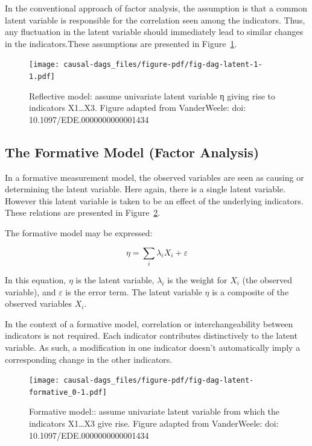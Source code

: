 \documentclass[
  singlecolumn]{report}
\begin{document}
In the conventional approach of factor analysis, the assumption is that
a common latent variable is responsible for the correlation seen among
the indicators. Thus, any fluctuation in the latent variable should
immediately lead to similar changes in the indicators.These assumptions
are presented in Figure~\ref{fig-dag-latent-1}.

\begin{figure}

{\centering \texttt{[image: causal-dags\_files/figure-pdf/fig-dag-latent-1-1.pdf]}

}

\caption{\label{fig-dag-latent-1}Reflective model: assume univariate
latent variable η giving rise to indicators X1\ldots X3. Figure adapted
from VanderWeele: doi: 10.1097/EDE.0000000000001434}

\end{figure}

\hypertarget{the-formative-model-factor-analysis}{%
\subsection{The Formative Model (Factor
Analysis)}\label{the-formative-model-factor-analysis}}

In a formative measurement model, the observed variables are seen as
causing or determining the latent variable. Here again, there is a
single latent variable. However this latent variable is taken to be an
effect of the underlying indicators. These relations are presented in
Figure~\ref{fig-dag-latent-formative_0}.

The formative model may be expressed:

\[\eta = \sum_i\lambda_i X_i + \varepsilon\]

In this equation, \(\eta\) is the latent variable, \(\lambda_i\) is the
weight for \(X_i\) (the observed variable), and \(\varepsilon\) is the
error term. The latent variable \(\eta\) is a composite of the observed
variables \(X_i\).

In the context of a formative model, correlation or interchangeability
between indicators is not required. Each indicator contributes
distinctively to the latent variable. As such, a modification in one
indicator doesn't automatically imply a corresponding change in the
other indicators.

\begin{figure}

{\centering \texttt{[image: causal-dags\_files/figure-pdf/fig-dag-latent-formative\_0-1.pdf]}

}

\caption{\label{fig-dag-latent-formative_0}Formative model:: assume
univariate latent variable from which the indicators X1\ldots X3 give
rise. Figure adapted from VanderWeele: doi:
10.1097/EDE.0000000000001434}

\end{figure}
\end{document}
